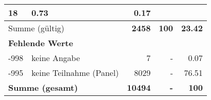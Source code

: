 \begin{longtable}{lXrrr}
       \num{18} &
       \num[round-mode=places,round-precision=2]{0.73} &
         \num[round-mode=places,round-precision=2]{0.17} \\
     \midrule
     \multicolumn{2}{l}{Summe (gültig)} &
       \textbf{\num{2458}} &
     \textbf{\num{100}} &
       \textbf{\num[round-mode=places,round-precision=2]{23.42}} \\
     \multicolumn{5}{l}{\textbf{Fehlende Werte}}\\
       -998 &
       keine Angabe &
         \num{7} &
        - &
         \num[round-mode=places,round-precision=2]{0.07} \\
       -995 &
       keine Teilnahme (Panel) &
         \num{8029} &
        - &
         \num[round-mode=places,round-precision=2]{76.51} \\
     \midrule
     \multicolumn{2}{l}{\textbf{Summe (gesamt)}} &
          \textbf{\num{10494}} &
        \textbf{-} &
        \textbf{\num{100}} \\
     \bottomrule
     \end{longtable}
     
